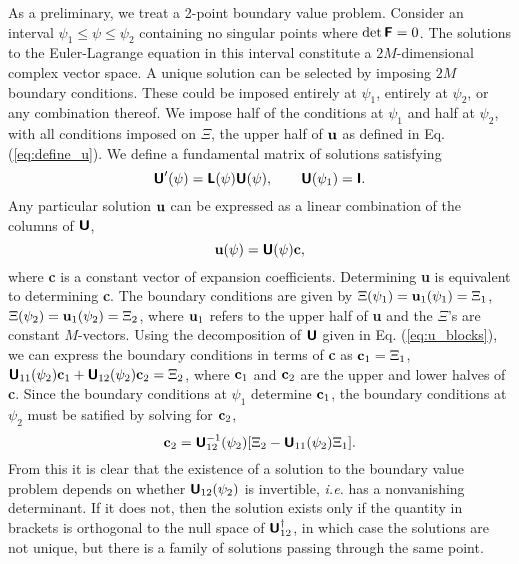 \documentclass[prb,twocolumn,showpacs,preprintnumbers,amsmath,amssymb]{revtex4}
\renewcommand*{\v}[1]{\hbox{\bfseries #1}}
\renewcommand*{\t}[1]{\hbox{\sffamily\bfseries #1}}
\begin{document}
As a preliminary, we treat a 2-point boundary value problem.  Consider
an interval $\psi_1 \le \psi \le \psi_2$ containing no singular points
where $\det \t{F}=0$.  The solutions to the Euler-Lagrange equation in
this interval constitute a $2M$-dimensional complex vector space.  A
unique solution can be selected by imposing $2M$ boundary conditions.
These could be imposed entirely at $\psi_1$, entirely at $\psi_2$, or
any combination thereof.  We impose half of the conditions at $\psi_1$
and half at $\psi_2$, with all conditions imposed on $\Xi$, the upper
half of $\v{u}$ as defined in Eq. (\ref{eq:define_u}).  We define a
fundamental matrix of solutions satisfying
\begin{equation}
\t{U}'(\psi) = \t{L}(\psi) \t{U}(\psi), \qquad \t{U}(\psi_1) = \t{I}.
\label{eq:define_U}
\end{equation}
Any particular solution $\v{u}$ can be expressed as a linear combination
of the columns of $\t{U}$,
\begin{equation}
\v{u}(\psi) = \t{U}(\psi) \v{c},
\label{eq:define_c}
\end{equation}
where \v{c} is a constant vector of expansion coefficients.  Determining
\v{u} is equivalent to determining \v{c}.  The boundary conditions are
given by $\Xi(\psi_1) = \v{u}_1(\psi_1) = \Xi_1$, $\Xi(\psi_2) =
\v{u}_1(\psi_2) = \Xi_2$, where $\v{u}_1$ refers to the upper half of
\v{u} and the $\Xi$'s are constant $M$-vectors.  Using the decomposition
of $\t{U}$ given in Eq. (\ref{eq:u_blocks}), we can express the boundary
conditions in terms of \v{c} as $\v{c}_1 = \Xi_1$, $\t{U}_{11}(\psi_2)
\v{c}_1 + \t{U}_{12}(\psi_2) \v{c}_2 = \Xi_2$, where $\v{c}_1$ and
$\v{c}_2$ are the upper and lower halves of \v{c}.  Since the boundary
conditions at $\psi_1$ determine $\v{c}_1$, the boundary conditions at
$\psi_2$ must be satified by solving for $\v{c}_2$,
\begin{equation}
\v{c}_2 = \t{U}_{12}^{-1}(\psi_2) [\Xi_2 - \t{U}_{11}(\psi_2) \Xi_1]. 
\label{eq:define_c2_1}
\end{equation}
From this it is clear that the existence of a solution to the boundary
value problem depends on whether $\t{U}_{12}(\psi_2)$ is invertible,
{\it i.e.} has a nonvanishing determinant.  If it does not, then the
solution exists only if the quantity in brackets is orthogonal to the
null space of $\t{U}_{12}^\dagger$, in which case the solutions are not
unique, but there is a family of solutions passing through the same
point.
\end{document}
